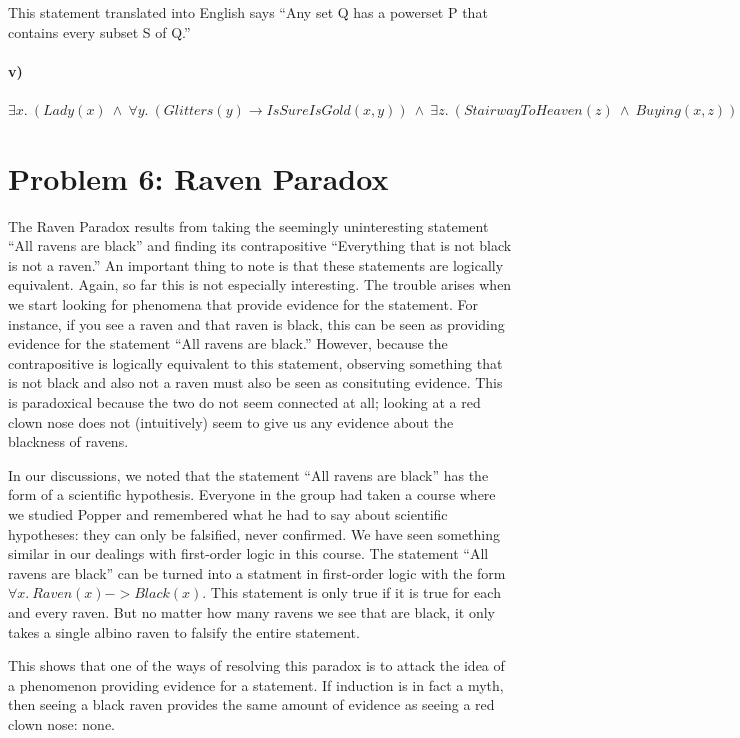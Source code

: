 \documentclass[10pt,letter]{article}
\begin{document}
This statement translated into English says ``Any set Q has a powerset P that contains every subset S of Q.''
\paragraph{v)}
$\exists x .\ (Lady(x)\ \wedge\ \forall y .\ (Glitters(y) \rightarrow IsSureIsGold(x, y))\ \wedge\ \exists z .\ (StairwayToHeaven(z)\ \wedge\ Buying(x, z)))$

\section*{Problem 6: Raven Paradox}
The Raven Paradox results from taking the seemingly uninteresting statement ``All ravens are black'' and finding its contrapositive ``Everything that is not black is not a raven.'' An important thing to note is that these statements are logically equivalent. Again, so far this is not especially interesting. The trouble arises when we start looking for phenomena that provide evidence for the statement. For instance, if you see a raven and that raven is black, this can be seen as providing evidence for the statement ``All ravens are black.'' However, because the contrapositive is logically equivalent to this statement, observing something that is not black and also not a raven must also be seen as consituting evidence. This is paradoxical because the two do not seem connected at all; looking at a red clown nose does not (intuitively) seem to give us any evidence about the blackness of ravens. 

In our discussions, we noted that the statement ``All ravens are black'' has the form of a scientific hypothesis. Everyone in the group had taken a course where we studied Popper and remembered what he had to say about scientific hypotheses: they can only be falsified, never confirmed. We have seen something similar in our dealings with first-order logic in this course. The statement ``All ravens are black'' can be turned into a statment in first-order logic with the form $\forall x .\ Raven(x) -> Black(x)$. This statement is only true if it is true for each and every raven. But no matter how many ravens we see that are black, it only takes a single albino raven to falsify the entire statement. 

This shows that one of the ways of resolving this paradox is to attack the idea of a phenomenon providing evidence for a statement. If induction is in fact a myth, then seeing a black raven provides the same amount of evidence as seeing a red clown nose: none. 
\end{document}
